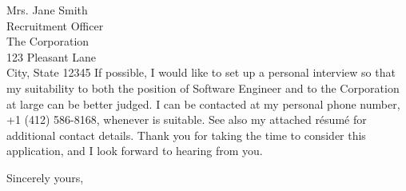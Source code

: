 \documentclass[11pt]{letter} %
\begin{document}
\begin{letter}{Mrs. Jane Smith \\
Recruitment Officer \\
The Corporation \\
123 Pleasant Lane \\
City, State 12345}
If possible, I would like to set up a personal interview so that my suitability
to both the position of Software Engineer and to the Corporation at large can
be better judged. I can be contacted at my personal phone number,
+1 (412) 586-8168, whenever is suitable. See also my attached résumé for
additional contact details. Thank you for taking the time to consider this
application, and I look forward to hearing from you.

\closing{Sincerely yours,}




\end{letter}


\end{document}
